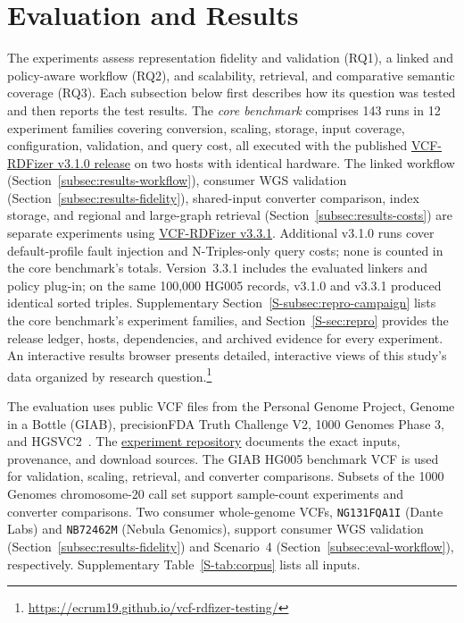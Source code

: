 \documentclass[pdflatex,sn-mathphys-num]{sn-jnl}
\begin{document}
\section{Evaluation and Results}\label{sec:results}
The experiments assess representation fidelity and validation (RQ1), a linked and policy-aware workflow (RQ2), and scalability, retrieval, and comparative semantic coverage (RQ3).
Each subsection below first describes how its question was tested and then reports the test results.
The \emph{core benchmark} comprises 143 runs in 12 experiment families covering conversion, scaling, storage, input coverage, configuration, validation, and query cost, all executed with the published \href{https://github.com/ecrum19/VCF-RDFizer/tree/v3.1.0}{VCF-RDFizer v3.1.0 release} on two hosts with identical hardware.
The linked workflow (Section~\ref{subsec:results-workflow}), consumer WGS validation (Section~\ref{subsec:results-fidelity}), shared-input converter comparison, index storage, and regional and large-graph retrieval (Section~\ref{subsec:results-costs}) are separate experiments using \href{https://github.com/ecrum19/VCF-RDFizer/tree/v3.3.1}{VCF-RDFizer v3.3.1}.
Additional v3.1.0 runs cover default-profile fault injection and N-Triples-only query costs; none is counted in the core benchmark's totals.
Version~3.3.1 includes the evaluated linkers and policy plug-in; on the same 100,000 HG005 records, v3.1.0 and v3.3.1 produced identical sorted triples.
Supplementary Section~\ref{S-subsec:repro-campaign} lists the core benchmark's experiment families, and Section~\ref{S-sec:repro} provides the release ledger, hosts, dependencies, and archived evidence for every experiment.
An interactive results browser presents detailed, interactive views of this study's data organized by research question.\footnote{\url{https://ecrum19.github.io/vcf-rdfizer-testing/}}

The evaluation uses public VCF files from the Personal Genome Project, Genome in a Bottle (GIAB), precisionFDA Truth Challenge V2, 1000 Genomes Phase 3, and HGSVC2~\cite{personal_genome_proj,giab_v421_2022,olson2022precisionfda,thousand_genomes_2015,hgsvc_2021}.
The \href{https://github.com/ecrum19/vcf-rdfizer-testing#datasets}{experiment repository} documents the exact inputs, provenance, and download sources.
The GIAB HG005 benchmark VCF is used for validation, scaling, retrieval, and converter comparisons.
Subsets of the 1000 Genomes chromosome-20 call set support sample-count experiments and converter comparisons.
Two consumer whole-genome VCFs, \texttt{NG131FQA1I} (Dante Labs) and \texttt{NB72462M} (Nebula Genomics), support consumer WGS validation (Section~\ref{subsec:results-fidelity}) and Scenario~4 (Section~\ref{subsec:eval-workflow}), respectively.
Supplementary Table~\ref{S-tab:corpus} lists all inputs.
\end{document}
